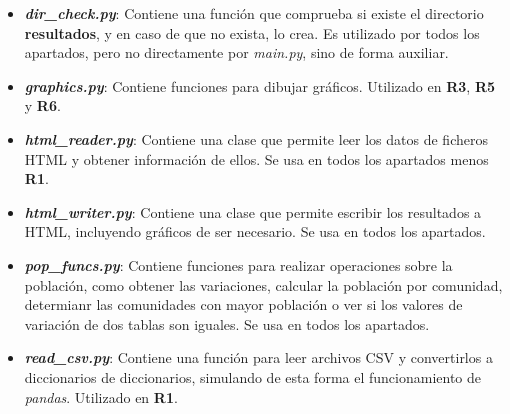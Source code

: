 \documentclass[11pt,a4paper]{article}
\begin{document}
\begin{itemize}
	\item \textbf{\textit{dir\_check.py}}: Contiene una función que comprueba si existe el directorio \textbf{resultados},
	y en caso de que no exista, lo crea. Es utilizado por todos los apartados, pero no directamente por \textit{main.py},
	sino de forma auxiliar.
	\item \textbf{\textit{graphics.py}}: Contiene funciones para dibujar gráficos. Utilizado en \textbf{R3}, \textbf{R5}
	y \textbf{R6}.
	\item \textbf{\textit{html\_reader.py}}: Contiene una clase que permite leer los datos de ficheros HTML y obtener información
	de ellos. Se usa en todos los apartados menos \textbf{R1}.
	\item \textbf{\textit{html\_writer.py}}: Contiene una clase que permite escribir los resultados a HTML, incluyendo gráficos
	de ser necesario. Se usa en todos los apartados.
	\item \textbf{\textit{pop\_funcs.py}}: Contiene funciones para realizar operaciones sobre la población, como obtener
	las variaciones, calcular la población por comunidad, determianr las comunidades con mayor población o ver si los
	valores de variación de dos tablas son iguales. Se usa en todos los apartados.
	\item \textbf{\textit{read\_csv.py}}: Contiene una función para leer archivos CSV y convertirlos a diccionarios
	de diccionarios, simulando de esta forma el funcionamiento de \textit{pandas}. Utilizado en \textbf{R1}.
\end{itemize}
\end{document}
